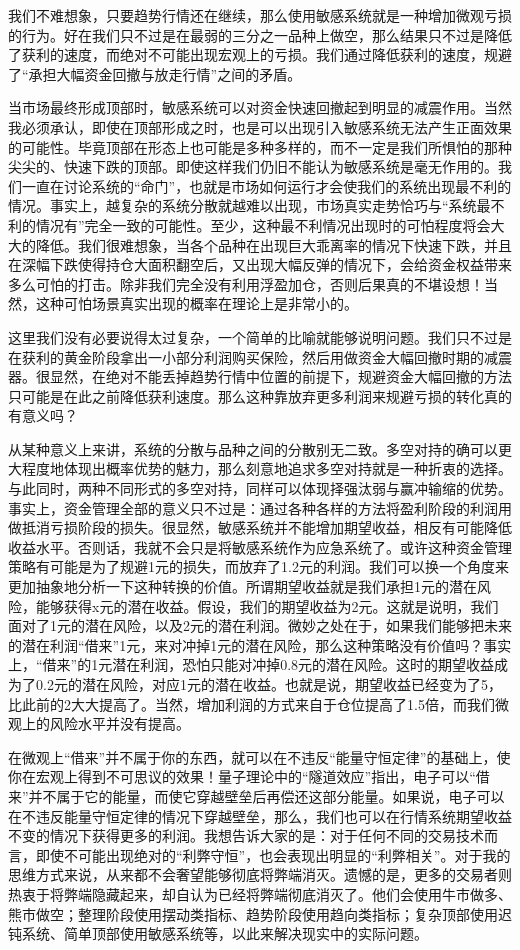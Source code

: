我们不难想象，只要趋势行情还在继续，那么使用敏感系统就是一种增加微观亏损的行为。好在我们只不过是在最弱的三分之一品种上做空，那么结果只不过是降低了获利的速度，而绝对不可能出现宏观上的亏损。我们通过降低获利的速度，规避了“承担大幅资金回撤与放走行情”之间的矛盾。

当市场最终形成顶部时，敏感系统可以对资金快速回撤起到明显的减震作用。当然我必须承认，即使在顶部形成之时，也是可以出现引入敏感系统无法产生正面效果的可能性。毕竟顶部在形态上也可能是多种多样的，而不一定是我们所惧怕的那种尖尖的、快速下跌的顶部。即使这样我们仍旧不能认为敏感系统是毫无作用的。我们一直在讨论系统的“命门”，也就是市场如何运行才会使我们的系统出现最不利的情况。事实上，越复杂的系统分散就越难以出现，市场真实走势恰巧与“系统最不利的情况有”完全一致的可能性。至少，这种最不利情况出现时的可怕程度将会大大的降低。我们很难想象，当各个品种在出现巨大乖离率的情况下快速下跌，并且在深幅下跌使得持仓大面积翻空后，又出现大幅反弹的情况下，会给资金权益带来多么可怕的打击。除非我们完全没有利用浮盈加仓，否则后果真的不堪设想！当然，这种可怕场景真实出现的概率在理论上是非常小的。

这里我们没有必要说得太过复杂，一个简单的比喻就能够说明问题。我们只不过是在获利的黄金阶段拿出一小部分利润购买保险，然后用做资金大幅回撤时期的减震器。很显然，在绝对不能丢掉趋势行情中位置的前提下，规避资金大幅回撤的方法只可能是在此之前降低获利速度。那么这种靠放弃更多利润来规避亏损的转化真的有意义吗？

从某种意义上来讲，系统的分散与品种之间的分散别无二致。多空对持的确可以更大程度地体现出概率优势的魅力，那么刻意地追求多空对持就是一种折衷的选择。与此同时，两种不同形式的多空对持，同样可以体现择强汰弱与赢冲输缩的优势。事实上，资金管理全部的意义只不过是：通过各种各样的方法将盈利阶段的利润用做抵消亏损阶段的损失。很显然，敏感系统并不能增加期望收益，相反有可能降低收益水平。否则话，我就不会只是将敏感系统作为应急系统了。或许这种资金管理策略有可能是为了规避1元的损失，而放弃了1.2元的利润。我们可以换一个角度来更加抽象地分析一下这种转换的价值。所谓期望收益就是我们承担1元的潜在风险，能够获得x元的潜在收益。假设，我们的期望收益为2元。这就是说明，我们面对了1元的潜在风险，以及2元的潜在利润。微妙之处在于，如果我们能够把未来的潜在利润“借来”1元，来对冲掉1元的潜在风险，那么这种策略没有价值吗？事实上，“借来”的1元潜在利润，恐怕只能对冲掉0.8元的潜在风险。这时的期望收益成为了0.2元的潜在风险，对应1元的潜在收益。也就是说，期望收益已经变为了5，比此前的2大大提高了。当然，增加利润的方式来自于仓位提高了1.5倍，而我们微观上的风险水平并没有提高。

在微观上“借来”并不属于你的东西，就可以在不违反“能量守恒定律”的基础上，使你在宏观上得到不可思议的效果！量子理论中的“隧道效应”指出，电子可以“借来”并不属于它的能量，而使它穿越壁垒后再偿还这部分能量。如果说，电子可以在不违反能量守恒定律的情况下穿越壁垒，那么，我们也可以在行情系统期望收益不变的情况下获得更多的利润。我想告诉大家的是：对于任何不同的交易技术而言，即使不可能出现绝对的“利弊守恒”，也会表现出明显的“利弊相关”。对于我的思维方式来说，从来都不会奢望能够彻底将弊端消灭。遗憾的是，更多的交易者则热衷于将弊端隐藏起来，却自认为已经将弊端彻底消灭了。他们会使用牛市做多、熊市做空；整理阶段使用摆动类指标、趋势阶段使用趋向类指标；复杂顶部使用迟钝系统、简单顶部使用敏感系统等，以此来解决现实中的实际问题。

\clearpage
